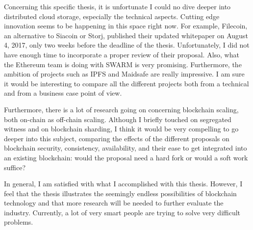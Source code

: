 Concerning this specific thesis, it is unfortunate I could no dive deeper into distributed cloud storage, especially the technical aspects. Cutting edge innovation seems to be happening in this space right now. For example, Filecoin, an alternative to Siacoin or Storj, published their updated whitepaper on August 4, 2017, only two weeks before the deadline of the thesis. Unfortunately, I did not have enough time to incorporate a proper review of their proposal. Also, what the Ethereum team is doing with SWARM is very promising. Furthermore, the ambition of projects such as IPFS and Maidsafe are really impressive. I am sure it would be interesting to compare all the different projects both from a technical and from a business case point of view. 

Furthermore, there is a lot of research going on concerning blockchain scaling, both on-chain as off-chain scaling. Although I briefly touched on segregated witness and on blockchain sharding, I think it would be very compelling to go deeper into this subject, comparing the effects of the different proposals on blockchain security, consistency, availability, and their ease to get integrated into an existing blockchain: would the proposal need a hard fork or would a soft work suffice?

In general, I am satisfied with what I accomplished with this thesis. However, I feel that the thesis illustrates the seemingly endless possibilities of blockchain technology and that more research will be needed to further evaluate the industry. Currently, a lot of very smart people are trying to solve very difficult problems.